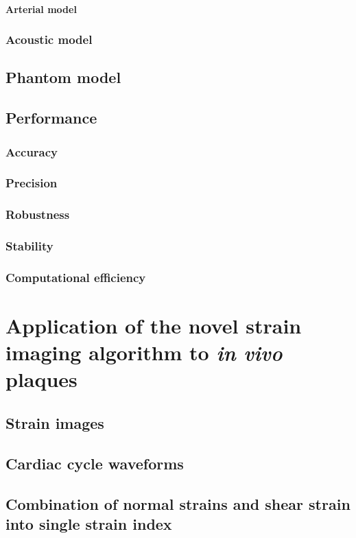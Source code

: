 \documentclass[12pt,twoside]{withesis}
\begin{document}
\subsubsection{Arterial model}
\subsection{Acoustic model}

\section{Phantom model}

\section{Performance}
\subsection{Accuracy}
\subsection{Precision}
\subsection{Robustness}
\subsection{Stability}
\subsection{Computational efficiency}


\chapter{Application of the novel strain imaging algorithm to \textit{in vivo}
plaques}

\section{Strain images}

\section{Cardiac cycle waveforms}

\section{Combination of normal strains and shear strain into single strain index}
\end{document}
